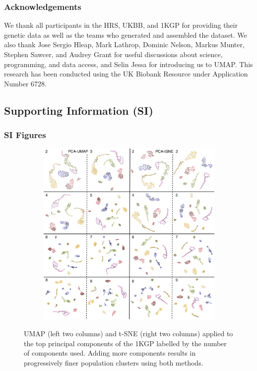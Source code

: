 \documentclass[12pt]{pnas-new}
\newcommand{\beginsupplement}{%
        \setcounter{table}{0}
        \renewcommand{\thetable}{S\arabic{table}}%
        \setcounter{figure}{0}
        \renewcommand{\thefigure}{S\arabic{figure}}%
     }
\begin{document}
\subsubsection*{Acknowledgements}
We thank all participants in the HRS, UKBB, and 1KGP for providing their genetic data as well as the teams who generated and assembled the dataset. We also thank Jose Sergio Hleap, Mark Lathrop, Dominic Nelson, Markus Munter, Stephen Sawcer, and Audrey Grant for useful discussions about science, programming, and data access, and Selin Jessa for introducing us to UMAP. This research has been conducted using the UK Biobank Resource under Application Number 6728.



\newpage

\beginsupplement
\subsection*{Supporting Information (SI)}
\subsubsection*{SI Figures}
\begin{figure}
    \centering
    \begin{subfigure}{\textwidth}
    \includegraphics[width=\textwidth]{images/megamontage_PC2_9.pdf}
    \end{subfigure}
    \caption{UMAP (left two columns) and t-SNE (right two columns) applied to the top principal components of the 1KGP labelled by the number of components used. Adding more components results in progressively finer population clusters using both methods.}
    \label{fig:supp_megamontage_pc2_9}  
\end{figure}
\end{document}
